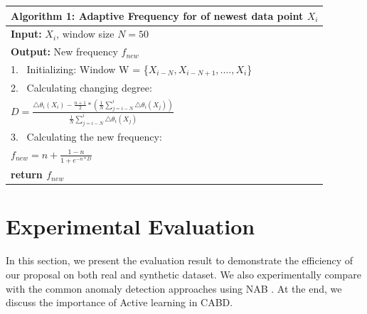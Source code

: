 \begin{table}[h]
	\centering
	\begin{tabular}{l}
		\toprule
		\textbf{Algorithm 1:} Adaptive Frequency for of newest data point $ X_i $\\
		\midrule
		\textbf{Input: } $ X_i $, window size $ N = 50 $ \\
		\textbf{Output:} New frequency $ f_{new} $ \\
		1.~ Initializing: Window W = \{$ X_{i-N}, X_{i-N+1}, .... , X_i $\}	 \\
		2.~ Calculating changing degree: \\
		\hspace{10mm}		$ D = \frac{\triangle\theta_i(X_i) - \frac{n+1}{2}*(\frac{1}{N}\sum_{j=i-N}^{i} \triangle\theta_i(X_j))}{\frac{1}{N}\sum_{j=i-N}^{i} \triangle\theta_i(X_j)} $ \\
		3.~ Calculating the new frequency: \\
		\hspace{10mm} 		$ f_{new} = n + \frac{1-n}{1 + e^{-n*D}} $\\
		\textbf{return $ f_{new} $}
	\end{tabular}
	\label{tab:AL_1}
\end{table}


\section{Experimental Evaluation}
In this section, we present the evaluation result to demonstrate the efficiency of our proposal on both real and synthetic dataset. We also experimentally compare with the common anomaly detection approaches using NAB \cite{lavin2015evaluating}. At the end, we discuss the importance of Active learning in CABD.



